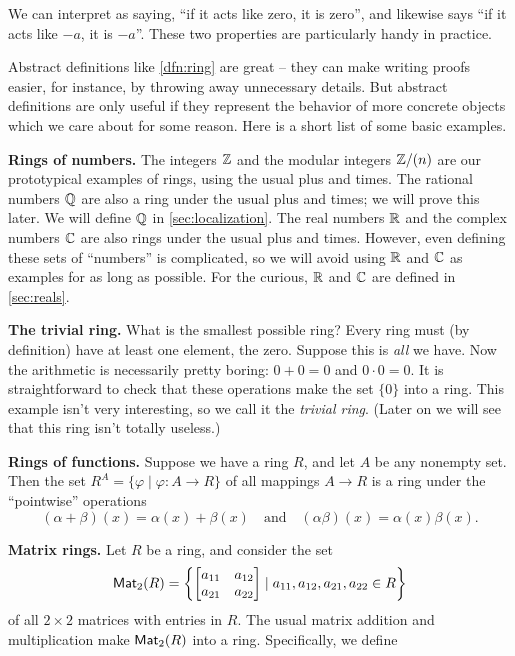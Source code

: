 We can interpret  as saying, ``if it acts like zero, it is zero'', and likewise  says ``if it acts like \(-a\), it is \(-a\)''. These two properties are particularly handy in practice.

Abstract definitions like \ref{dfn:ring} are great -- they can make writing proofs easier, for instance, by throwing away unnecessary details. But abstract definitions are only useful if they represent the behavior of more concrete objects which we care about for some reason. Here is a short list of some basic examples.

\begin{examples}
\item \textbf{Rings of numbers.} \label{examp:numbers} The integers \(\mathbb{Z}\) and the modular integers \(\mathbb{Z}/(n)\) are our prototypical examples of rings, using the usual plus and times. The rational numbers \(\mathbb{Q}\) are also a ring under the usual plus and times; we will prove this later. We will define \(\mathbb{Q}\) in \autoref{sec:localization}. The real numbers \(\mathbb{R}\) and the complex numbers \(\mathbb{C}\) are also rings under the usual plus and times. However, even defining these sets of ``numbers'' is complicated, so we will avoid using \(\mathbb{R}\) and \(\mathbb{C}\) as examples for as long as possible. For the curious, \(\mathbb{R}\) and \(\mathbb{C}\) are defined in \autoref{sec:reals}.

\item \textbf{The trivial ring.} \label{examp:zero-ring} What is the smallest possible ring? Every ring must (by definition) have at least one element, the zero. Suppose this is \emph{all} we have. Now the arithmetic is necessarily pretty boring: \(0+0 = 0\) and \(0 \cdot 0 = 0\). It is straightforward to check that these operations make the set \(\{0\}\) into a ring. This example isn't very interesting, so we call it the \emph{trivial ring}. (Later on we will see that this ring isn't totally useless.)

\item \textbf{Rings of functions.} \label{examp:rings-of-functions} Suppose we have a ring \(R\), and let \(A\) be any nonempty set. Then the set \(R^A = \{ \varphi \mid \varphi : A \rightarrow R \}\) of all mappings \(A \rightarrow R\) is a ring under the ``pointwise'' operations \[ (\alpha + \beta)(x) = \alpha(x) + \beta(x) \quad \mathrm{and} \quad (\alpha\beta)(x) = \alpha(x) \beta(x). \]

\item \textbf{Matrix rings.} Let \(R\) be a ring, and consider the set \[ \mathsf{Mat}_{2}(R) = \left\{ \begin{bmatrix} a_{11} & a_{12} \\ a_{21} & a_{22} \end{bmatrix} \mid a_{11}, a_{12}, a_{21}, a_{22} \in R \right\} \] of all \(2 \times 2\) matrices with entries in \(R\). The usual matrix addition and multiplication make \(\mathsf{Mat}_{2}(R)\) into a ring. Specifically, we define


\end{examples}
